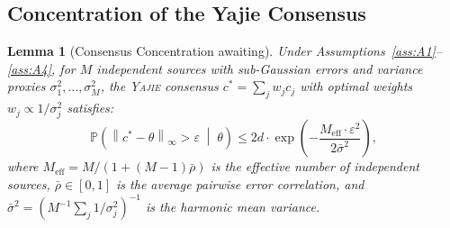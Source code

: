 \documentclass[11pt,a4paper]{article}
\newtheorem{lemma}[theorem]{Lemma}
\theoremstyle{definition}
\newcommand{\Yajie}{\textsc{Yajie}}
\newcommand{\Pbb}{\mathbb{P}}
\newcommand{\norm}[1]{\left\lVert#1\right\rVert}
\begin{document}
\subsection{Concentration of the Yajie Consensus}

\begin{lemma}[Consensus Concentration awaiting]
\label{lem:consensus_concentration}
Under Assumptions~\ref{ass:A1}--\ref{ass:A4}, for $M$ independent sources with sub-Gaussian errors and variance proxies $\sigma_1^2, \ldots, \sigma_M^2$, the \Yajie{} consensus $c^* = \sum_j w_j c_j$ with optimal weights $w_j \propto 1/\sigma_j^2$ satisfies:
\begin{equation}
    \Pbb\left(\norm{c^* - \theta}_\infty > \varepsilon \;\middle|\; \theta\right) \leq 2d \cdot \exp\left(-\frac{M_{\mathrm{eff}} \cdot \varepsilon^2}{2\bar{\sigma}^2}\right),
    \label{eq:consensus_concentration}
\end{equation}
where $M_{\mathrm{eff}} = M / (1 + (M-1)\bar{\rho})$ is the effective number of independent sources, $\bar{\rho} \in [0, 1]$ is the average pairwise error correlation, and $\bar{\sigma}^2 = (M^{-1}\sum_j 1/\sigma_j^2)^{-1}$ is the harmonic mean variance.
\end{lemma}
\end{document}
